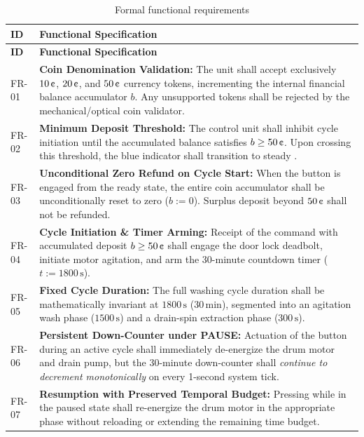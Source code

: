 \begin{longtable}{L{1.4cm}L{13.1cm}}
  \caption{Formal functional requirements}\label{tab:fr}\\
  \toprule
  \textbf{ID} & \textbf{Functional Specification} \\
  \midrule
  \endfirsthead
  \toprule
  \textbf{ID} & \textbf{Functional Specification} \\
  \midrule
  \endhead
  \bottomrule
  \endfoot
  FR-01 & \textbf{Coin Denomination Validation:} The unit shall accept exclusively $10\,\text{\textcent}$, $20\,\text{\textcent}$, and $50\,\text{\textcent}$ currency tokens, incrementing the internal financial balance accumulator $b$. Any unsupported tokens shall be rejected by the mechanical/optical coin validator. \\
  FR-02 & \textbf{Minimum Deposit Threshold:} The control unit shall inhibit cycle initiation until the accumulated balance satisfies $b \ge 50\,\text{\textcent}$. Upon crossing this threshold, the blue indicator  shall transition to steady . \\
  FR-03 & \textbf{Unconditional Zero Refund on Cycle Start:} When the  button is engaged from the ready state, the entire coin accumulator shall be unconditionally reset to zero ($b := 0$). Surplus deposit beyond $50\,\text{\textcent}$ shall not be refunded. \\
  FR-04 & \textbf{Cycle Initiation \& Timer Arming:} Receipt of the  command with accumulated deposit $b \ge 50\,\text{\textcent}$ shall engage the door lock deadbolt, initiate motor agitation, and arm the 30-minute countdown timer ($t := 1800\,\text{s}$). \\
  FR-05 & \textbf{Fixed Cycle Duration:} The full washing cycle duration shall be mathematically invariant at $1800\,\text{s}$ ($30\,\text{min}$), segmented into an agitation wash phase ($1500\,\text{s}$) and a drain-spin extraction phase ($300\,\text{s}$). \\
  FR-06 & \textbf{Persistent Down-Counter under PAUSE:} Actuation of the  button during an active cycle shall immediately de-energize the drum motor and drain pump, but the 30-minute down-counter shall \emph{continue to decrement monotonically} on every 1-second system tick. \\
  FR-07 & \textbf{Resumption with Preserved Temporal Budget:} Pressing  while in the paused state shall re-energize the drum motor in the appropriate phase without reloading or extending the remaining time budget. \\

\end{longtable}
